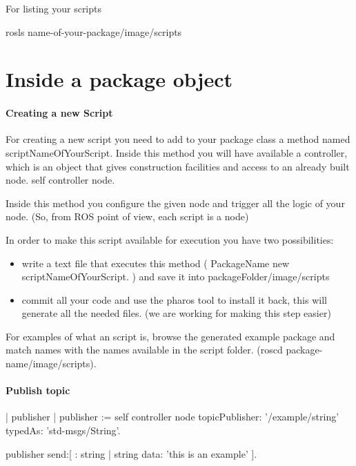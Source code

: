 \documentclass[a4paper,10pt,twoside]{book}
\begin{document}
	For listing your scripts \newline
	
		rosls name-of-your-package/image/scripts \newline
	
	\section{Inside a package object }
	
	\paragraph{Creating a new Script \newline}


	
		For creating a new script you need to add to your package class a method named script{NameOfYourScript}. Inside this method you will have available a controller, which is an object that gives construction facilities and access to an already built  node. 
		self controller node. 
		
		Inside this method you configure the given node and trigger all the logic of your node. (So, from ROS point of view, each script is a node)
		
		In order to make this script available for execution you have two possibilities: 
		\begin{itemize}
			\item write a text file that executes this method ( PackageName new script{NameOfYourScript}. ) and save it into packageFolder/image/scripts 
			\item commit all your code and use the pharos tool to install it back, this will generate all the needed files. (we are working for making this step easier) 
		\end{itemize}
				
		For examples of what an script is, browse the generated example package and match names with the names available in the script folder. (roscd {package-name}/image/scripts).
		
	\paragraph{Publish topic  \newline}
	
	
	\begin{code}
	| publisher |
	publisher := self controller node 
						topicPublisher: '/example/string' 
						typedAs: 'std-msgs/String'.
						
	publisher send:[ : string | string data: 'this is an example' ].
	
	\end{code}
	
\end{document}
